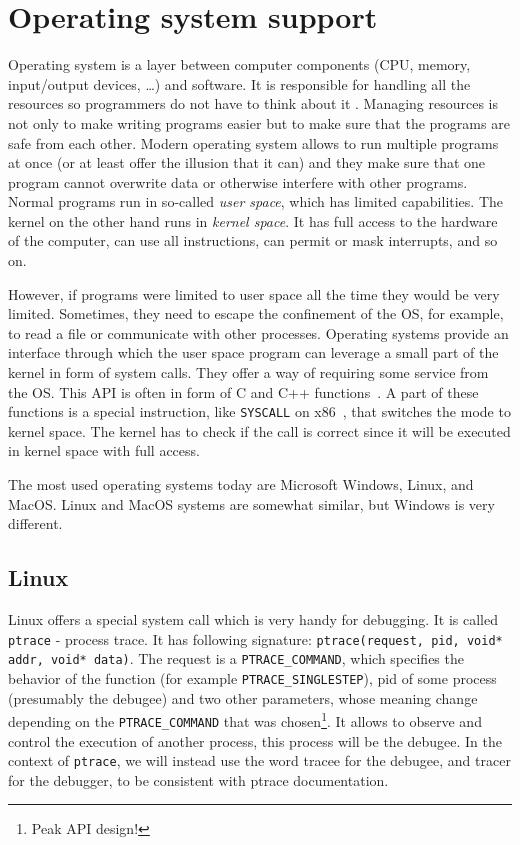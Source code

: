 \section{Operating system support}
Operating system is a layer between computer components (CPU, memory,
input/output devices, \dots) and software. It is responsible for handling all
the resources so programmers do not have to think about it \cite{modern-os,
os-concepts}. Managing resources is not only to make writing programs easier
but to make sure that the programs are safe from each other. Modern operating
system allows to run multiple programs at once (or at least offer the illusion
that it can) and they make sure that one program cannot overwrite data or
otherwise interfere with other programs. Normal programs run in so-called
\textit{user space}, which has limited capabilities. The kernel on the other
hand runs in \textit{kernel space}. It has full access to the hardware of the
computer, can use all instructions, can permit or mask interrupts, and so on.

However, if programs were limited to user space all the time they would be very
limited. Sometimes, they need to escape the confinement of the OS, for example,
to read a file or communicate with other processes. Operating systems provide
an interface through which the user space program can leverage a small part of
the kernel in form of system calls. They offer a way of requiring some service
from the OS. This API is often in form of C and C++
functions~\cite{os-concepts}. A part of these functions is a special
instruction, like \texttt{SYSCALL} on x86~\cite{intel-manual}, that switches
the mode to kernel space. The kernel has to check if the call is correct since
it will be executed in kernel space with full access.

The most used operating systems today are Microsoft Windows, Linux, and MacOS.
Linux and MacOS systems are somewhat similar, but Windows is very different.

\subsection{Linux}
Linux offers a special system call which is very handy for debugging. It is
called \texttt{ptrace} \cite{ptrace} - process trace. It has following
signature: \texttt{ptrace(request, pid, void* addr, void* data)}. The request
is a \texttt{PTRACE\_COMMAND}, which specifies the behavior of the function
(for example \texttt{PTRACE\_SINGLESTEP}), pid of some process (presumably the
debugee) and two other parameters, whose meaning change depending on the
\texttt{PTRACE\_COMMAND} that was chosen\footnote{Peak API design!}. It allows
to observe and control the execution of another process, this process will be
the debugee. In the context of \texttt{ptrace}, we will instead use the word
tracee for the debugee, and tracer for the debugger, to be consistent with
ptrace documentation.

